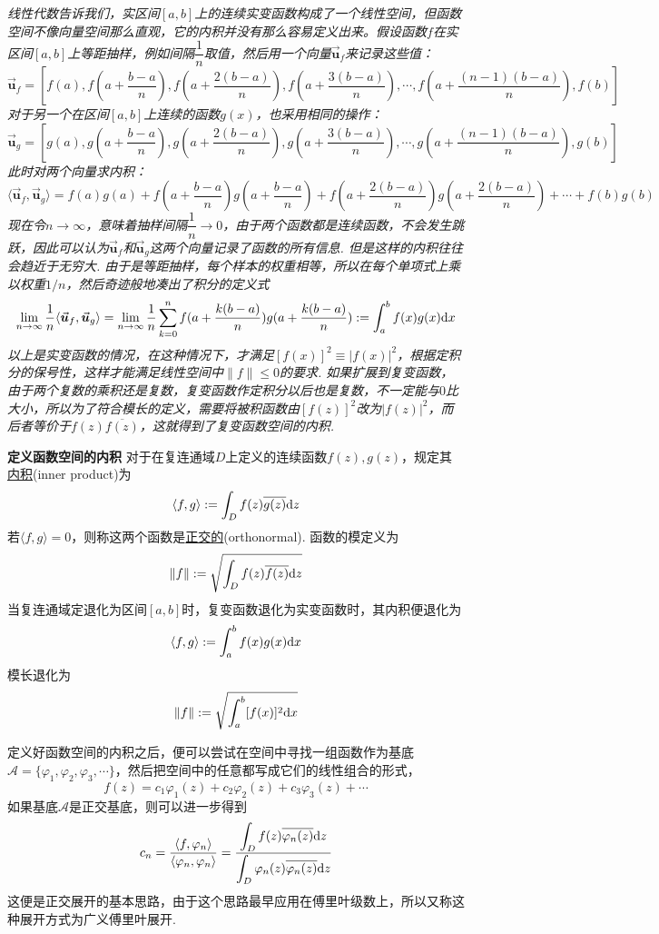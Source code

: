 \documentclass[UTF8]{ctexart}
\newcommand{\trm}[1]{{\rm #1}}
\newenvironment{definition}[1]
    {\begin{tcolorbox}[enhanced, colback=LightYellow, breakable=false, frame hidden, borderline west={1.5mm}{-2mm}{DarkGreen}]
    {\bfseries {\color{DarkGreen} 定义}\quad #1} \newline}
    {\end{tcolorbox}}
\begin{document}
\textit{
线性代数告诉我们，实区间\([a,b]\)上的连续实变函数构成了一个线性空间，但函数空间不像向量空间那么直观，它的内积并没有那么容易定义出来。假设函数\(f\)在实区间\([a,b]\)上等距抽样，例如间隔\(\dfrac{1}{n}\)取值，然后用一个向量\(\vec{\bm{u}}_f\)来记录这些值：
\[\vec{\bm{u}}_f = \left[f(a), f(a+\frac{b-a}{n}), f(a+\frac{2(b-a)}{n}), f(a+\frac{3(b-a)}{n}), \cdots, f(a+\frac{(n-1)(b-a)}{n}), f(b)\right]\]
对于另一个在区间\([a,b]\)上连续的函数\(g(x)\)，也采用相同的操作：
\[\vec{\bm{u}}_g = \left[g(a), g(a+\frac{b-a}{n}), g(a+\frac{2(b-a)}{n}), g(a+\frac{3(b-a)}{n}), \cdots, g(a+\frac{(n-1)(b-a)}{n}), g(b)\right]\]
此时对两个向量求内积：
\[\langle\vec{\bm{u}}_f,\vec{\bm{u}}_g\rangle = f(a)g(a)+f(a+\frac{b-a}{n})g(a+\frac{b-a}{n})+f(a+\frac{2(b-a)}{n})g(a+\frac{2(b-a)}{n})+\cdots+f(b)g(b)\]
现在令\(n \to \infty\)，意味着抽样间隔\(\dfrac{1}{n} \to 0\)，由于两个函数都是连续函数，不会发生跳跃，因此可以认为\(\vec{\bm{u}}_f\)和\(\vec{\bm{u}}_g\)这两个向量记录了函数的所有信息. 但是这样的内积往往会趋近于无穷大. 由于是等距抽样，每个样本的权重相等，所以在每个单项式上乘以权重\(1/n\)，然后奇迹般地凑出了积分的定义式
\[\lim_{n \to \infty}\frac{1}{n}\langle\vec{\bm{u}}_f,\vec{\bm{u}}_g\rangle = \lim_{n \to \infty}\frac{1}{n}\sum_{k=0}^{n}f(a+\frac{k(b-a)}{n})g(a+\frac{k(b-a)}{n}) := \int_{a}^{b} f(x)g(x)\trm{d}x\]
以上是实变函数的情况，在这种情况下，才满足\([f(x)]^2\equiv|f(x)|^2\)，根据定积分的保号性，这样才能满足线性空间中\(\|f\|\leq 0\)的要求. 如果扩展到复变函数，由于两个复数的乘积还是复数，复变函数作定积分以后也是复数，不一定能与\(0\)比大小，所以为了符合模长的定义，需要将被积函数由\([f(z)]^2\)改为\(|f(z)|^2\)，而后者等价于\(f(z)\overline{f(z)}\)，这就得到了复变函数空间的内积.
}
\begin{definition}{函数空间的内积}
    对于在复连通域\(D\)上定义的连续函数\(f(z),g(z)\)，规定其\uline{内积}(inner product)为
    \[ \langle f,g \rangle := \int_{D} f(z)\overline{g(z)}\trm{d}z\]
    若\(\langle f,g \rangle=0\)，则称这两个函数是\uline{正交的}(orthonormal). 函数的模定义为
    \[ \|f\| := \sqrt{\int_{D}f(z)\overline{f(z)}\trm{d}z}\]
    当复连通域定退化为区间\([a,b]\)时，复变函数退化为实变函数时，其内积便退化为
    \[ \langle f,g \rangle := \int_{a}^{b} f(x)g(x)\trm{d}x\]
    模长退化为
    \[ \|f\| := \sqrt{\int_{a}^{b}[f(x)]^2\trm{d}x}\]
\end{definition}

定义好函数空间的内积之后，便可以尝试在空间中寻找一组函数作为基底\(\mathcal{A}=\{\varphi_1,\varphi_2,\varphi_3,\cdots\}\)，然后把空间中的任意都写成它们的线性组合的形式，
\[f(z) = c_1\varphi_1(z)+c_2\varphi_2(z)+c_3\varphi_3(z)+\cdots\]
如果基底\(\mathcal{A}\)是正交基底，则可以进一步得到
\[c_n=\frac{\langle f,\varphi_n \rangle}{\langle \varphi_n,\varphi_n \rangle} = \frac{\displaystyle{\int_{D} f(z)\overline{\varphi_n(z)}\trm{d}z}}{\displaystyle{\int_{D}\varphi_n(z)\overline{\varphi_n(z)}\trm{d}z}}\]
这便是正交展开的基本思路，由于这个思路最早应用在傅里叶级数上，所以又称这种展开方式为广义傅里叶展开.
\end{document}
